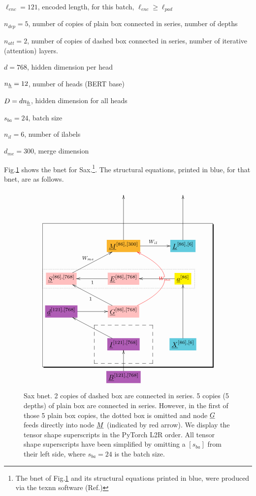$\ell_{enc}=121$, encoded length, for this batch, $\ell_{enc}\geq \ell_{pad}$

$n_{dep}=5$, number of copies of plain box connected in series, number of depths

 $n_{att}=2$, number of copies of
dashed box connected in series, number of iterative (attention) layers.


$d=768$, hidden dimension per head

$n_{\underline{h}}=12$, number of heads (BERT base)

$D=d n_{\underline{h}}$, hidden dimension
for all heads


$s_{ba}=24$, batch size

$n_{il}=6$, number of ilabels

$d_{me}=300$, merge dimension

Fig.\ref{fig-texnn-for-sentence-ax-bnet}
shows the bnet  for Sax.\footnote{The
bnet of Fig.\ref{fig-texnn-for-sentence-ax-bnet}
and its structural equations
printed in blue,
were produced via the texnn software (Ref.\cite{texnn})}. The structural equations, printed in 
blue, for that bnet, are as follows.

\begin{figure}[h!]\centering
$$\xymatrix@R=2.5pc@C=3.5pc{
&&
\\
&&
\\
&*+[F*:Dandelion]{\underline{M}^{[86], [300]}}\ar[uu]\ar[r]^{W_{il}}&*+[F*:SkyBlue]{\underline{L}^{[86], [6]}}\ar[uu]
\\
*+[F*:pink]{\underline{S}^{[86], [768]}}\ar[ur]^{W_{me}}&*+[F*:pink]{\underline{E}^{[86], [768]}}\ar[l]^{1}&*+[F*:yellow]{\underline{a}^{[86]}}\ar[l]
\\
*+[F*:Orchid]{\underline{d}^{[121], [768]}}\ar[r]&*+[F*:pink]{\underline{G}^{[86], [768]}}\ar@[red]@/_5pc/[uu]|-{\color{red} W_{me}}\ar[ul]^{1}&
\\
&*+[F*:Orchid]{\underline{I}^{[121], [768]}}\ar[ul]&*+[F*:SkyBlue]{\underline{X}^{[86], [6]}}\ar[uu]
\\
&*+[F*:Orchid]{\underline{B}^{[121], [768]}}\ar[u]&
\save
\POS"3,1"."6,1"."3,3"."6,3"!C*+<4.8em>\frm{-,}
\POS"6,2"."6,2"."6,2"."6,2"!C*+<3.8em>\frm{--}
\POS"4,1"."4,1"."4,3"."4,3"!C*+<1.0em>\frm{.}
\restore
}$$
\caption{Sax bnet. 2 copies of dashed box are connected in series. 5 copies (5 depths) of plain box are connected in series.  However, in the first of those 5 plain box copies, the dotted box  is omitted and node $\underline{G}$ feeds directly into node  $\underline{M}$ (indicated by red arrow). We display the tensor shape superscripts in the PyTorch L2R order. All tensor shape superscripts have been simplified by omitting a $[s_{ba}]$ from their left side, where $s_{ba}=24$ is the batch size. }
\label{fig-texnn-for-sentence-ax-bnet}
\end{figure}

